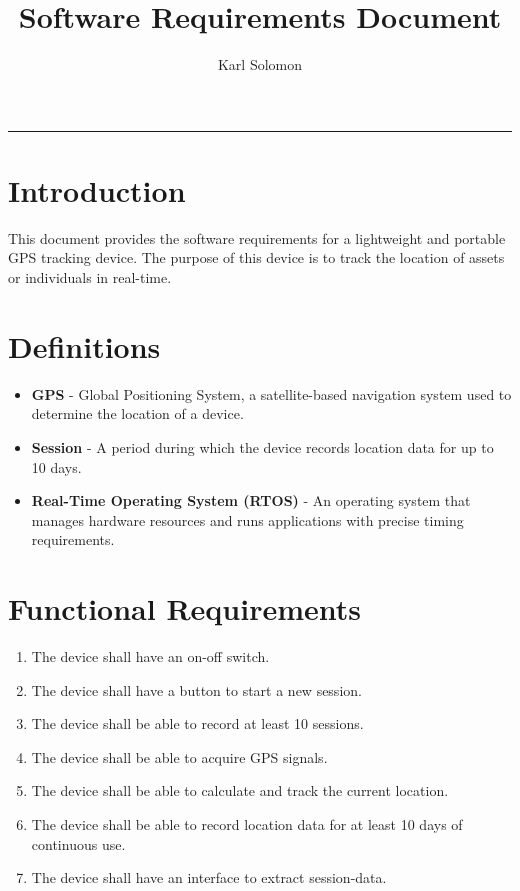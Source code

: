 \documentclass[a4paper,11pt]{article}
\title{\textbf{Software Requirements Document} \\ \vspace{0.5em} \productName}
\author{Karl Solomon}
\date{}
\begin{document}
\maketitle

\tableofcontents
\vspace{1em}
\hrule
\vspace{1em}

\newpage

\section{Introduction}
This document provides the software requirements for a lightweight and portable GPS tracking device. The purpose of this device is to track the location of assets or individuals in real-time.

\section{Definitions}
\begin{itemize}[label=,itemindent=1em]
	\item \textbf{GPS} - Global Positioning System, a satellite-based navigation system used to determine the location of a device.
	\item \textbf{Session} - A period during which the device records location data for up to 10 days.
	\item \textbf{Real-Time Operating System (RTOS)} - An operating system that manages hardware resources and runs applications with precise timing requirements.
\end{itemize}

\newpage

\section{Functional Requirements}
\begin{enumerate}[label=\textbf{FR\arabic*}, itemindent=1em]
	\item The device shall have an on-off switch.
	\item The device shall have a button to start a new session.
	\item The device shall be able to record at least 10 sessions.
	\item The device shall be able to acquire GPS signals.
	\item The device shall be able to calculate and track the current location.
	\item The device shall be able to record location data for at least 10 days of continuous use.
	\item The device shall have an interface to extract session-data.
\end{enumerate}
\end{document}

